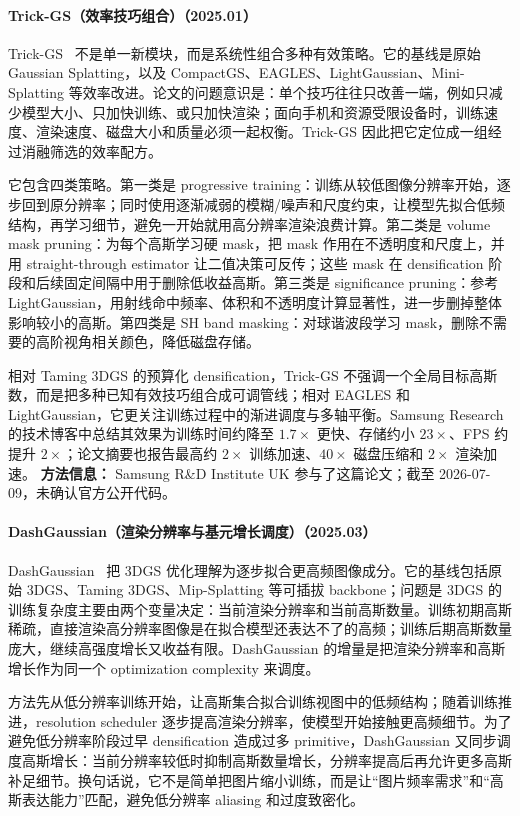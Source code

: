 \paragraph{Trick-GS（效率技巧组合）（2025.01）}
Trick-GS~\cite{2501_14534} 不是单一新模块，而是系统性组合多种有效策略。它的基线是原始 Gaussian Splatting，以及 CompactGS、EAGLES、LightGaussian、Mini-Splatting 等效率改进。论文的问题意识是：单个技巧往往只改善一端，例如只减少模型大小、只加快训练、或只加快渲染；面向手机和资源受限设备时，训练速度、渲染速度、磁盘大小和质量必须一起权衡。Trick-GS 因此把它定位成一组经过消融筛选的效率配方。

它包含四类策略。第一类是 progressive training：训练从较低图像分辨率开始，逐步回到原分辨率；同时使用逐渐减弱的模糊/噪声和尺度约束，让模型先拟合低频结构，再学习细节，避免一开始就用高分辨率渲染浪费计算。第二类是 volume mask pruning：为每个高斯学习硬 mask，把 mask 作用在不透明度和尺度上，并用 straight-through estimator 让二值决策可反传；这些 mask 在 densification 阶段和后续固定间隔中用于删除低收益高斯。第三类是 significance pruning：参考 LightGaussian，用射线命中频率、体积和不透明度计算显著性，进一步删掉整体影响较小的高斯。第四类是 SH band masking：对球谐波段学习 mask，删除不需要的高阶视角相关颜色，降低磁盘存储。

相对 Taming 3DGS 的预算化 densification，Trick-GS 不强调一个全局目标高斯数，而是把多种已知有效技巧组合成可调管线；相对 EAGLES 和 LightGaussian，它更关注训练过程中的渐进调度与多轴平衡。Samsung Research 的技术博客中总结其效果为训练时间约降至 $1.7\times$ 更快、存储约小 $23\times$、FPS 约提升 $2\times$；论文摘要也报告最高约 $2\times$ 训练加速、$40\times$ 磁盘压缩和 $2\times$ 渲染加速。
\textbf{方法信息：} Samsung R\&D Institute UK 参与了这篇论文；截至 2026-07-09，未确认官方公开代码。



\paragraph{DashGaussian（渲染分辨率与基元增长调度）（2025.03）}
DashGaussian~\cite{2503_18402} 把 3DGS 优化理解为逐步拟合更高频图像成分。它的基线包括原始 3DGS、Taming 3DGS、Mip-Splatting 等可插拔 backbone；问题是 3DGS 的训练复杂度主要由两个变量决定：当前渲染分辨率和当前高斯数量。训练初期高斯稀疏，直接渲染高分辨率图像是在拟合模型还表达不了的高频；训练后期高斯数量庞大，继续高强度增长又收益有限。DashGaussian 的增量是把渲染分辨率和高斯增长作为同一个 optimization complexity 来调度。

方法先从低分辨率训练开始，让高斯集合拟合训练视图中的低频结构；随着训练推进，resolution scheduler 逐步提高渲染分辨率，使模型开始接触更高频细节。为了避免低分辨率阶段过早 densification 造成过多 primitive，DashGaussian 又同步调度高斯增长：当前分辨率较低时抑制高斯数量增长，分辨率提高后再允许更多高斯补足细节。换句话说，它不是简单把图片缩小训练，而是让“图片频率需求”和“高斯表达能力”匹配，避免低分辨率 aliasing 和过度致密化。


